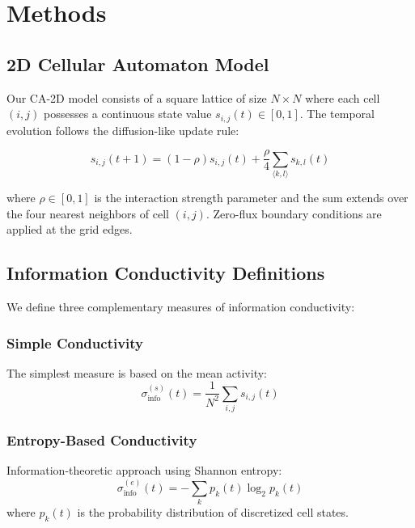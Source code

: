 \documentclass[twocolumn,showpacs,preprintnumbers,amsmath,amssymb,prb]{revtex4-2}
\newcommand{\infocond}{\sigma_{\text{info}}}
\newcommand{\rhointer}{\rho}
\begin{document}
\section{Methods}
\label{sec:methods}

\subsection{2D Cellular Automaton Model}
\label{sec:ca_model}

Our CA-2D model consists of a square lattice of size $N \times N$ where each cell $(i,j)$ possesses a continuous state value $s_{i,j}(t) \in [0,1]$. The temporal evolution follows the diffusion-like update rule:

\begin{equation}
s_{i,j}(t+1) = (1-\rhointer) s_{i,j}(t) + \frac{\rhointer}{4} \sum_{\langle k,l \rangle} s_{k,l}(t)
\label{eq:update_rule}
\end{equation}

where $\rhointer \in [0,1]$ is the interaction strength parameter and the sum extends over the four nearest neighbors of cell $(i,j)$. Zero-flux boundary conditions are applied at the grid edges.

\subsection{Information Conductivity Definitions}
\label{sec:info_conductivity}

We define three complementary measures of information conductivity:

\subsubsection{Simple Conductivity}
The simplest measure is based on the mean activity:
\begin{equation}
\infocond^{(s)}(t) = \frac{1}{N^2} \sum_{i,j} s_{i,j}(t)
\label{eq:simple_conductivity}
\end{equation}

\subsubsection{Entropy-Based Conductivity}
Information-theoretic approach using Shannon entropy:
\begin{equation}
\infocond^{(e)}(t) = -\sum_{k} p_k(t) \log_2 p_k(t)
\label{eq:entropy_conductivity}
\end{equation}
where $p_k(t)$ is the probability distribution of discretized cell states.
\end{document}
